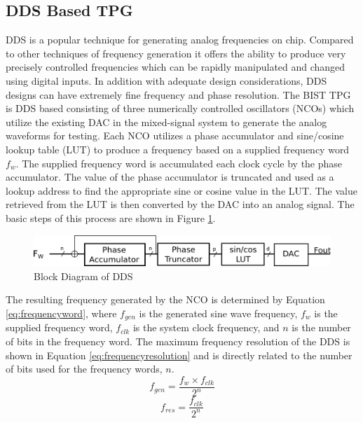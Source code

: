 \documentclass[12pt]{report}
\begin{document}
\subsection{DDS Based TPG}
DDS is a popular technique for generating analog frequencies on chip.  Compared to other techniques of frequency generation it offers the ability to produce very precisely controlled frequencies which can be rapidly manipulated and changed using digital inputs\cite{qi}.  In addition with adequate design considerations, DDS designs can have extremely fine frequency and phase resolution.  The BIST TPG is DDS based consisting of three numerically controlled oscillators (NCOs) which utilize the existing DAC in the mixed-signal system to generate the analog waveforms for testing\cite{testtime}.  Each NCO utilizes a phase accumulator and sine/cosine lookup table (LUT) to produce a frequency based on a supplied frequency word $f_w$. The supplied frequency word is accumulated each clock cycle by the phase accumulator.  The value of the phase accumulator is truncated and used as a lookup address to find the appropriate sine or cosine value in the LUT.  The value retrieved from the LUT is then converted by the DAC into an analog signal.  The basic steps of this process are shown in Figure \ref{fig:dds}.  
\begin{figure}
  \begin{center}
		\includegraphics[scale=.8]{images/dds-steps}
  \end{center}
  \caption{Block Diagram of DDS}
  \label{fig:dds}
\end{figure}
The resulting frequency generated by the NCO is determined by Equation \ref{eq:frequencyword}, where $f_{gen}$ is the generated sine wave frequency, $f_w$ is the supplied frequency word, $f_{clk}$ is the system clock frequency, and $n$ is the number of bits in the frequency word.  The maximum frequency resolution of the DDS is shown in Equation \ref{eq:frequencyresolution} and is directly related to the number of bits used for the frequency words, $n$.
\begin{equation}
	f_{gen} = \frac{f_w \times f_{clk}}{2^{n}}
	\label{eq:frequencyword}
\end{equation}
\begin{equation}
	f_{res} = \frac{f_{clk}}{2^{n}}
	\label{eq:frequencyresolution}
\end{equation}
\end{document}
